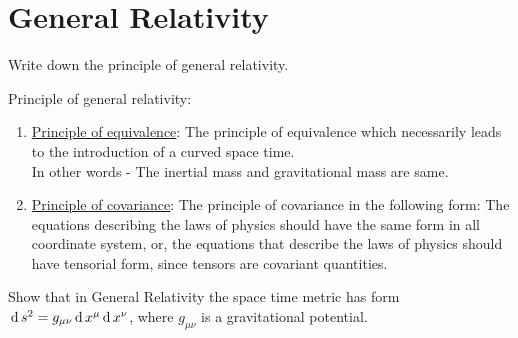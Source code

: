 \documentclass[../main-sheet.tex]{subfiles}
\begin{document}
\chapter{General Relativity}
\begin{prob}
    Write down the principle of general relativity.
\end{prob}
\begin{soln}
    Principle of general relativity:
    \begin{enumerate}
        \item \underline{Principle of equivalence}: The principle of equivalence which necessarily leads to the introduction of a curved space time.\\
        In other words - The inertial mass and gravitational mass are same.
        \item \underline{Principle of covariance}: The principle of covariance in the following form: The equations describing the laws of physics should have the same form in all coordinate system, or, the equations that describe the laws of physics should have tensorial form, since tensors are covariant quantities.
    \end{enumerate}
\end{soln}
\begin{prob}
    Show that in General Relativity the space time metric has form \(\,\mathrm{d}\, s^2=g_{\mu\nu}\,\mathrm{d}\, x^\mu\,\mathrm{d}\, x^\nu\), where \(g_{\mu\nu}\) is a gravitational potential.
\end{prob}
\end{document}
